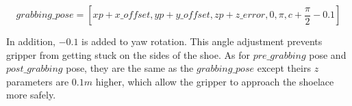\begin{equation}
grabbing\_pose = [xp + x\_offset, yp + y\_offset, zp + z\_error, 0, \pi, c + \frac{\pi}{2} - 0.1]
\label{grabpose}
\end{equation}

In addition, $-0.1$ is added to yaw rotation. This angle adjustment prevents gripper from getting stuck on the sides of the shoe. As for $pre\_grabbing$ pose and $post\_grabbing$ pose, they are the same as the $grabbing\_pose$ except theirs $z$ parameters are $0.1m$ higher, which allow the gripper to approach the shoelace more safely.

\begin{figure}
\centering
{}

\end{figure}
